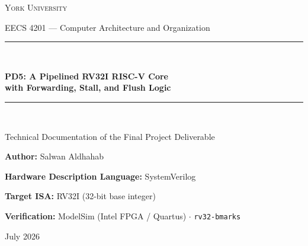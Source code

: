 \documentclass[11pt,a4paper]{article}
\newcommand{\code}[1]{\texttt{#1}}          %
\begin{document}
\begin{titlepage}
\centering
\vspace*{2.2cm}

{\Large\scshape York University\par}
{\large EECS 4201 --- Computer Architecture and Organization\par}
\vspace{2.4cm}

\rule{\linewidth}{0.4pt}\\[0.5cm]
{\huge\bfseries PD5: A Pipelined RV32I RISC-V Core\\[0.35cm]
with Forwarding, Stall, and Flush Logic\par}
\vspace{0.5cm}
\rule{\linewidth}{0.4pt}\\[0.8cm]

{\large Technical Documentation of the Final Project Deliverable\par}
\vspace{2.6cm}

{\large\textbf{Author:} Salwan Aldhahab\par}
\vspace{0.4cm}
{\large\textbf{Hardware Description Language:} SystemVerilog\par}
{\large\textbf{Target ISA:} RV32I (32-bit base integer)\par}
{\large\textbf{Verification:} ModelSim (Intel FPGA / Quartus) $\cdot$ \code{rv32-bmarks}\par}

\vfill
{\large July 2026\par}
\end{titlepage}
\end{document}
